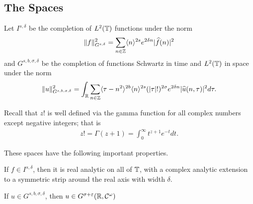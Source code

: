\subsection{The Spaces} 
\label{ssec:strategy}
Let $I^{s, \delta}$ be the completion of
$L^{2}(\mathbb{T})$ functions under the norm
%
%
\begin{equation*}
\begin{split}
  \| f \|_{G^{s, \delta}}^{2} = \sum_{n \in \mathbb{Z}} \langle n \rangle ^{2s}
  e^{2 \delta n} | \widehat{f}(n) |^{2}
\end{split}
\end{equation*}
%
%
and 
$G^{s,b, \sigma, \delta}$ be the completion
of functions Schwartz in time and $L^{2}(\mathbb{T})$ in space under the norm
%
%
\begin{equation*}
\begin{split}
  \| u \|^{2}_{G^{s,b, \sigma, \delta}} = \int_{\mathbb{R}} \sum_{n \in \mathbb{Z}} \langle
  \tau - n^{2} \rangle^{2b} \langle n \rangle^{2s}  (| \tau |!)^{2 \sigma}
  e^{2 \delta n} | \widehat{u}(n, \tau) |^{2} d \tau.
\end{split}
\end{equation*}
%
\begin{framed}
\begin{remark}
Recall that $z!$ is well defined via the gamma function for all complex numbers except negative
integers; that is
%
%
\begin{equation*}
\begin{split}
 z! = \Gamma(z + 1) = \int_{0}^{\infty} t^{z + 1} e^{-t} dt.
\end{split}
\end{equation*}
%
\end{remark}
\end{framed}
%
%
These spaces have the following important properties.
%
%
%
%
%                
%
%
%
%
\begin{lemma}
  If $f \in I^{s, \delta}$, 
      then it is real analytic on all of $\mathbb{T}$, with a complex
  analytic extension to a symmetric strip around the real axis with width $\delta$.
\label{lem:analy-embed}
\end{lemma}
%
%
%
%
%
%
%               
%
%
%
%
\begin{lemma}
  If $u \in G^{s, b, \sigma, \delta}$, then $u \in G^{\sigma + \varepsilon}(\mathbb{R},
  \mathcal{C}^{\omega})$
\label{lem:main-space-embed}
\end{lemma}
